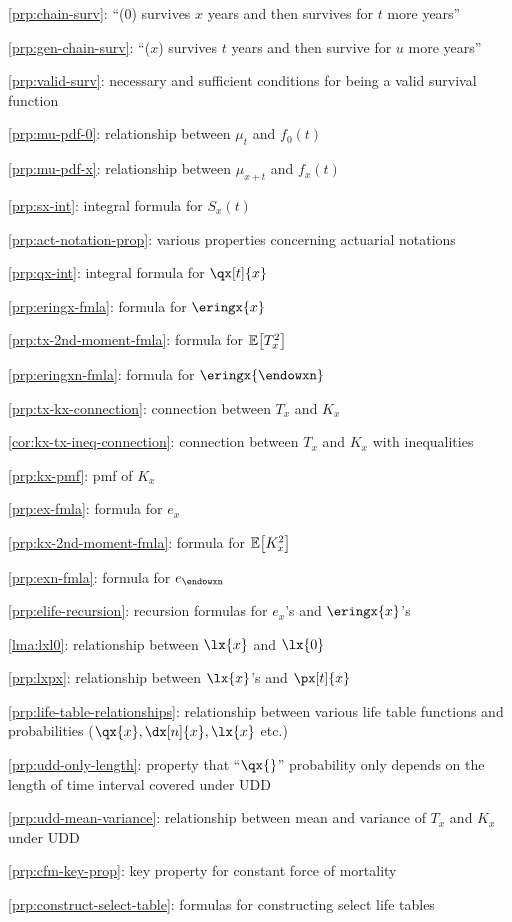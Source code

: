 \item \cref{prp:chain-surv}: ``(0) survives \(x\) years and then survives for \(t\) more years''
\item \cref{prp:gen-chain-surv}: ``(\(x\)) survives \(t\) years and then survive for \(u\) more years''
\item \cref{prp:valid-surv}: necessary and sufficient conditions for being a valid survival function
\item \cref{prp:mu-pdf-0}: relationship between \(\mu_t\) and \(f_0(t)\)
\item \cref{prp:mu-pdf-x}: relationship between \(\mu_{x+t}\) and \(f_x(t)\)
\item \cref{prp:sx-int}: integral formula for \(S_x(t)\)
\item \cref{prp:act-notation-prop}: various properties concerning actuarial notations 
\item \cref{prp:qx-int}: integral formula for \(\qx[t]{x}\)
\item \cref{prp:eringx-fmla}: formula for \(\eringx{x}\)
\item \cref{prp:tx-2nd-moment-fmla}: formula for \(\mathbb{E}\qty[T_x^2]\)
\item \cref{prp:eringxn-fmla}: formula for \(\eringx{\endowxn}\)
\item \cref{prp:tx-kx-connection}: connection between \(T_x\) and \(K_x\)
\item \cref{cor:kx-tx-ineq-connection}: connection between \(T_x\) and \(K_x\) with inequalities
\item \cref{prp:kx-pmf}: pmf of \(K_x\)
\item \cref{prp:ex-fmla}: formula for \(e_x\)
\item \cref{prp:kx-2nd-moment-fmla}: formula for \(\mathbb{E}\qty[K_x^2]\)
\item \cref{prp:exn-fmla}: formula for \(e_{\endowxn}\)
\item \cref{prp:elife-recursion}: recursion formulas for \(e_x\)'s and \(\eringx{x}\)'s
\item \cref{lma:lxl0}: relationship between \(\lx{x}\) and \(\lx{0}\)
\item \cref{prp:lxpx}: relationship between \(\lx{x}\)'s and \(\px[t]{x}\)
\item \cref{prp:life-table-relationships}: relationship between various life table functions and probabilities (\(\qx{x},\dx[n]{x},\lx{x}\) etc.)
\item \cref{prp:udd-only-length}: property that ``\(\qx{}\)'' probability only
depends on the length of time interval covered under UDD
\item \cref{prp:udd-mean-variance}: relationship between mean and variance of \(T_x\) and \(K_x\) under UDD
\item \cref{prp:cfm-key-prop}: key property for constant force of mortality
\item \cref{prp:construct-select-table}: formulas for constructing select life tables
